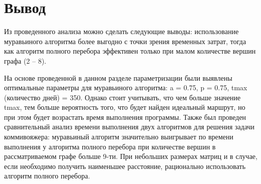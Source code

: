 \section*{Вывод}
Из проведенного анализа можно сделать следующие выводы: использование муравьиного алгоритма более выгодно с точки зрения временных затрат, тогда как алгоритм полного перебора эффективен только при малом количестве вершин графа (2 -- 8). 


На основе проведенной в данном разделе параметризации были выявлены оптимальные параметры для муравьиного алгоритма: a = 0.75, p = 0.75, tmax (количество дней) = 350. Однако стоит учитывать, что чем больше значение tmax, тем больше вероятность того, что будет найден идеальный маршрут, но при этом будет возрастать время выполнения программы. Также был проведен сравнительный анализ времени выполнения двух алгоритмов для решения задачи коммивояжера: муравьиный алгоритм значительно выигрывает по времени выполнения у алгоритма полного перебора при количестве вершин в рассматриваемом графе больше 9-ти. При небольших размерах матриц и в случае, если необходимо получить наименьшее
расстояние, рационально использовать алгоритм полного перебора.

